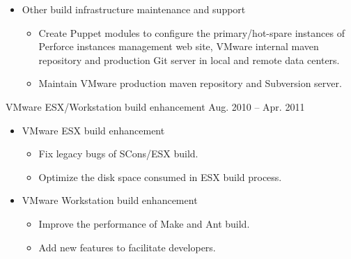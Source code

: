 \documentclass[10pt,letterpaper]{article}
\begin{document}
{{\begin{itemize}
\begin{itemize}
                \item Implement automatic Git accounts provision tool for
                    full-time employees and contractors.

                \item Consolidate VMware internal version of git-p4 and fix
                    bugs.
                \item Maintain VMware legacy gitorious server.
            \end{itemize}
        \item Other build infrastructure maintenance and support
            \begin{itemize}
                \item Create Puppet modules to configure the primary/hot-spare
                    instances of Perforce instances management web site, VMware
                    internal maven repository and production Git server in
                    local and remote data centers.
                \item Maintain VMware production maven repository and
                    Subversion server.
            \end{itemize}

    \end{itemize}
}
\headedsubsection %
{VMware ESX/Workstation build enhancement} {Aug. 2010 -- Apr. 2011}
{
    \begin{itemize}
        \item VMware ESX build enhancement
            \begin{itemize}
                \item Fix legacy bugs of SCons/ESX build.
                \item Optimize the disk space consumed in ESX build process.
            \end{itemize}
        \item VMware Workstation build enhancement
            \begin{itemize}
                \item Improve the performance of Make and Ant build.
                \item Add new features to facilitate developers.
            \end{itemize}
    \end{itemize}
}
}



\end{document}
